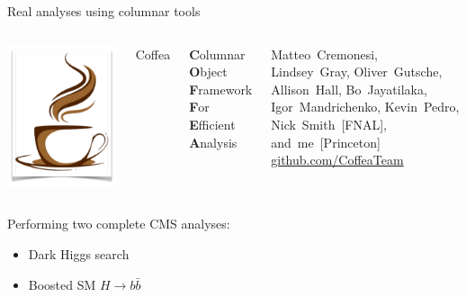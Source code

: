 \documentclass[aspectratio=169]{beamer}
\begin{document}
\begin{frame}{Real analyses using columnar tools}
\vspace{0.75 cm}
\begin{columns}
\includegraphics[width=\linewidth]{coffea-logo.png}

\hspace{-0.2 cm}\Huge Coffea

\vspace{0.25 cm}
\large {\bf C}olumnar {\bf O}bject {\bf F}ramework {\bf F}or {\bf E}fficient {\bf A}nalysis

\vspace{0.25 cm}
\normalsize Matteo~Cremonesi, Lindsey~Gray, Oliver~Gutsche, Allison~Hall, Bo~Jayatilaka, Igor~Mandrichenko, Kevin~Pedro, Nick~Smith~[FNAL], and~me~[Princeton] \hfill \textcolor{blue}{\url{github.com/CoffeaTeam}}
\end{columns}

\vspace{0.25 cm}
\begin{center}
\begin{minipage}{0.65\linewidth}
\Large Performing two complete CMS analyses:
\begin{itemize}
\item Dark Higgs search
\item Boosted SM $H \to b\bar{b}$
\end{itemize}
\end{minipage}
\end{center}
\end{frame}
\end{document}
